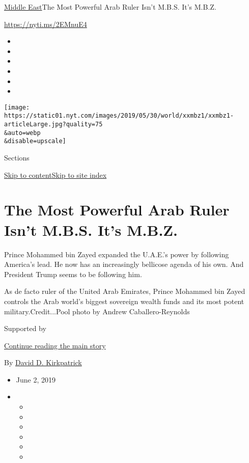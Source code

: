 \href{/section/world/middleeast}{Middle East}\textbar{}The Most Powerful
Arab Ruler Isn't M.B.S. It's M.B.Z.

\url{https://nyti.ms/2EMnuE4}

\begin{itemize}
\item
\item
\item
\item
\item
\item
\end{itemize}

\texttt{[image: https://static01.nyt.com/images/2019/05/30/world/xxmbz1/xxmbz1-articleLarge.jpg?quality=75\\\&auto=webp\\\&disable=upscale]}

Sections

\protect\hyperlink{site-content}{Skip to
content}\protect\hyperlink{site-index}{Skip to site index}

\hypertarget{the-most-powerful-arab-ruler-isnt-mbs-its-mbz}{%
\section{The Most Powerful Arab Ruler Isn't M.B.S. It's
M.B.Z.}\label{the-most-powerful-arab-ruler-isnt-mbs-its-mbz}}

Prince Mohammed bin Zayed expanded the U.A.E.'s power by following
America's lead. He now has an increasingly bellicose agenda of his own.
And President Trump seems to be following him.

As de facto ruler of the United Arab Emirates, Prince Mohammed bin Zayed
controls the Arab world's biggest sovereign wealth funds and its most
potent military.Credit...Pool photo by Andrew Caballero-Reynolds

Supported by

\protect\hyperlink{after-sponsor}{Continue reading the main story}

By \href{https://www.nytimes.com/by/david-d-kirkpatrick}{David D.
Kirkpatrick}

\begin{itemize}
\item
  June 2, 2019
\item
  \begin{itemize}
  \item
  \item
  \item
  \item
  \item
  \item
  \end{itemize}
\end{itemize}

